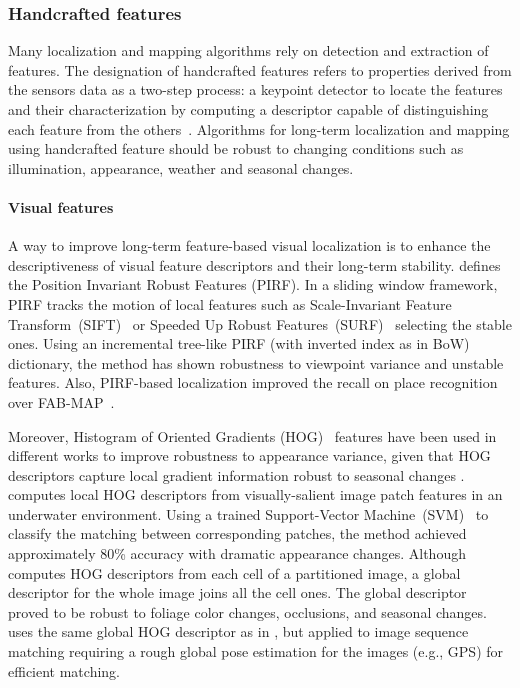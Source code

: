 \subsubsection{Handcrafted features}
\label{sec:discussion:appearance:handcrafted}

Many localization and mapping algorithms rely on detection and extraction of features. The designation of handcrafted features refers to properties derived from the sensors data as a two-step process: a keypoint detector to locate the features and their characterization by computing a descriptor capable of distinguishing each feature from the others~\parencite{discussion:handcrafted-features}.
Algorithms for long-term localization and mapping using handcrafted feature should be robust to changing conditions such as illumination, appearance, weather and seasonal changes.


\paragraph{Visual features}

A way to improve long-term feature-based visual localization is to enhance the descriptiveness of visual feature descriptors and their long-term stability.
\cite{kawewong-et-al:2013:826410} defines the Position Invariant Robust Features (PIRF). In a sliding window framework, PIRF tracks the motion of local features such as Scale-Invariant Feature Transform~(SIFT)~\parencite{original:sift} or Speeded Up Robust Features~(SURF)~\parencite{original:surf} selecting the stable ones.
Using an incremental tree-like PIRF (with inverted index as in BoW) dictionary, the method has shown robustness to viewpoint variance and unstable features. Also, PIRF-based localization improved the recall on place recognition over FAB-MAP~\parencite{discussion:fab-map}.

Moreover, Histogram of Oriented Gradients (HOG)~\parencite{original:hog} features have been used in different works to improve robustness to appearance variance, given that HOG descriptors capture local gradient information robust to seasonal changes \parencite{naseer-et-al:2015:7324181}.
\cite{li-et-al:2015:7139706} computes local HOG descriptors from visually-salient image patch features in an underwater environment. Using a trained Support-Vector Machine~(SVM)~\parencite{original:svm} to classify the matching between corresponding patches, the method achieved approximately 80\% accuracy with dramatic appearance changes.
Although \cite{naseer-et-al:2015:7324181} computes HOG descriptors from each cell of a partitioned image, a global descriptor for the whole image joins all the cell ones. The global descriptor proved to be robust to foliage color changes, occlusions, and seasonal changes.
\cite{vysotska-et-al:2015:7139576} uses the same global HOG descriptor as in \cite{naseer-et-al:2015:7324181}, but applied to image sequence matching requiring a rough global pose estimation for the images (e.g., GPS) for efficient matching.


